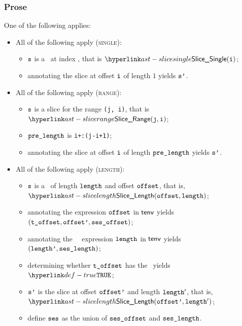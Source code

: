 \subsubsection{Prose}
One of the following applies:
\begin{itemize}
  \item All of the following apply (\textsc{single}):
  \begin{itemize}
    \item $\texttt{s}$ is a \singleslice\ at index \vi, that is $\SliceSingle(\vi)$;
    \item annotating the slice at offset $\texttt{i}$ of length $1$ yields $\texttt{s'}$\ProseOrTypeError.
  \end{itemize}

  \item All of the following apply (\textsc{range}):
  \begin{itemize}
    \item $\texttt{s}$ is a slice for the range \texttt{(j, i)}, that is $\SliceRange(\vj, \vi)$;
    \item $\texttt{pre\_length}$ is \texttt{i+:(j-i+1)};
    \item annotating the slice at offset $\texttt{i}$ of length $\texttt{pre\_length}$ yields $\texttt{s'}$\ProseOrTypeError.
  \end{itemize}

  \item All of the following apply (\textsc{length}):
  \begin{itemize}
    \item $\texttt{s}$ is a \lengthslice\ of length $\texttt{length}$ and offset $\texttt{offset}$, that is, \\
          $\SliceLength(\eoffset, \elength)$;
    \item annotating the expression $\texttt{offset}$ in $\textsf{tenv}$ yields \\
          $(\texttt{t\_offset}, \texttt{offset'}, \texttt{ses\_offset})$\ProseOrTypeError;
    \item annotating the \staticallyevaluable\ \constrainedinteger\ expression $\texttt{length}$ in $\textsf{tenv}$ yields
    $(\texttt{length'}, \texttt{ses\_length})$\ProseOrTypeError;
    \item determining whether $\texttt{t\_offset}$ has the \structureofinteger\ yields $\True$\ProseOrTypeError;
    \item $\texttt{s'}$ is the slice at offset $\texttt{offset'}$ and length $\texttt{length}'$, that is,\\
     $\SliceLength(\eoffsetp, \elength')$;
     \item define $\texttt{ses}$ as the union of $\texttt{ses\_offset}$ and $\texttt{ses\_length}$.
  \end{itemize}


\end{itemize}
